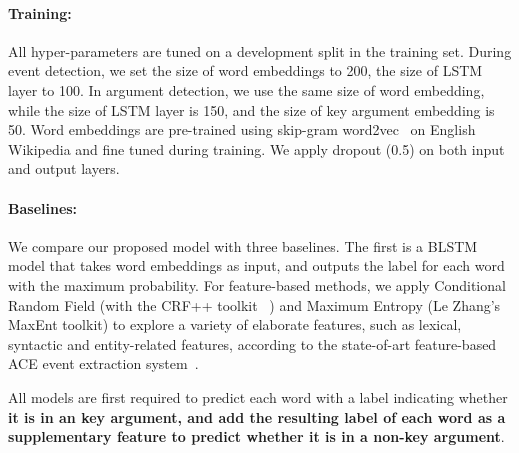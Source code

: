 \paragraph{Training:} All hyper-parameters are tuned on a development split in the training set. During event detection, we set the size of word embeddings to 200, the size of LSTM layer to 100. In argument detection, we use the same size of word embedding, while the size of LSTM layer is 150, and the size of key argument embedding is 50. Word embeddings are pre-trained using skip-gram word2vec~\cite{mikolov2013distributed} on English Wikipedia and fine tuned during training. We apply dropout (0.5) on both input and output layers.




\paragraph{Baselines:}
We compare our proposed model with three baselines. %
The first is a  BLSTM model that takes word embeddings as input, and outputs the label for each word with the maximum probability. %
For feature-based methods, we apply Conditional Random Field \cite{lafferty2001conditional} (with the CRF++ toolkit~\cite{kudo2005crf++} ) and Maximum Entropy \cite{berger1996maximum} (Le Zhang's MaxEnt toolkit) to explore a variety of elaborate features, such as lexical, syntactic and entity-related features, according to the state-of-art feature-based ACE event extraction system~\cite{li2013joint}. 

All models are first required to predict each word with a label indicating whether \textbf{it is in an key argument, and add the resulting label of each word as a supplementary feature to predict whether it is in a non-key argument}. 


